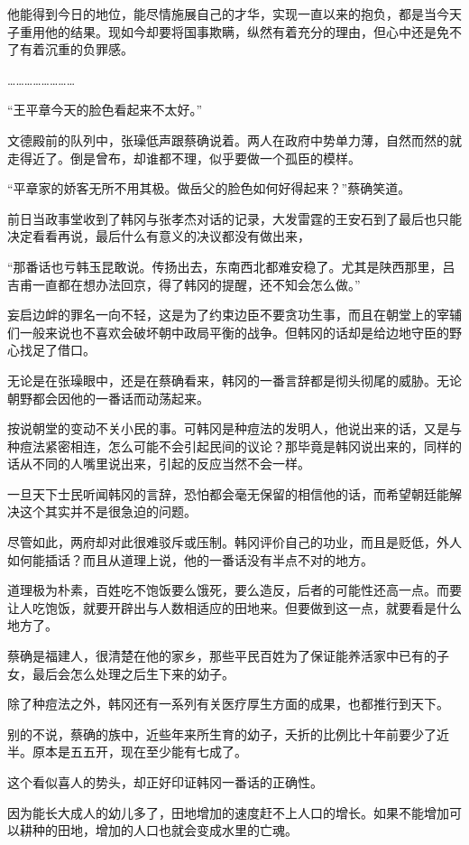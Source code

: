 他能得到今日的地位，能尽情施展自己的才华，实现一直以来的抱负，都是当今天子重用他的结果。现如今却要将国事欺瞒，纵然有着充分的理由，但心中还是免不了有着沉重的负罪感。

……………………

“王平章今天的脸色看起来不太好。”

文德殿前的队列中，张璪低声跟蔡确说着。两人在政府中势单力薄，自然而然的就走得近了。倒是曾布，却谁都不理，似乎要做一个孤臣的模样。

“平章家的娇客无所不用其极。做岳父的脸色如何好得起来？”蔡确笑道。

前日当政事堂收到了韩冈与张孝杰对话的记录，大发雷霆的王安石到了最后也只能决定看看再说，最后什么有意义的决议都没有做出来，

“那番话也亏韩玉昆敢说。传扬出去，东南西北都难安稳了。尤其是陕西那里，吕吉甫一直都在想办法回京，得了韩冈的提醒，还不知会怎么做。”

妄启边衅的罪名一向不轻，这是为了约束边臣不要贪功生事，而且在朝堂上的宰辅们一般来说也不喜欢会破坏朝中政局平衡的战争。但韩冈的话却是给边地守臣的野心找足了借口。

无论是在张璪眼中，还是在蔡确看来，韩冈的一番言辞都是彻头彻尾的威胁。无论朝野都会因他的一番话而动荡起来。

按说朝堂的变动不关小民的事。可韩冈是种痘法的发明人，他说出来的话，又是与种痘法紧密相连，怎么可能不会引起民间的议论？那毕竟是韩冈说出来的，同样的话从不同的人嘴里说出来，引起的反应当然不会一样。

一旦天下士民听闻韩冈的言辞，恐怕都会毫无保留的相信他的话，而希望朝廷能解决这个其实并不是很急迫的问题。

尽管如此，两府却对此很难驳斥或压制。韩冈评价自己的功业，而且是贬低，外人如何能插话？而且从道理上说，他的一番话没有半点不对的地方。

道理极为朴素，百姓吃不饱饭要么饿死，要么造反，后者的可能性还高一点。而要让人吃饱饭，就要开辟出与人数相适应的田地来。但要做到这一点，就要看是什么地方了。

蔡确是福建人，很清楚在他的家乡，那些平民百姓为了保证能养活家中已有的子女，最后会怎么处理之后生下来的幼子。

除了种痘法之外，韩冈还有一系列有关医疗厚生方面的成果，也都推行到天下。

别的不说，蔡确的族中，近些年来所生育的幼子，夭折的比例比十年前要少了近半。原本是五五开，现在至少能有七成了。

这个看似喜人的势头，却正好印证韩冈一番话的正确性。

因为能长大成人的幼儿多了，田地增加的速度赶不上人口的增长。如果不能增加可以耕种的田地，增加的人口也就会变成水里的亡魂。

